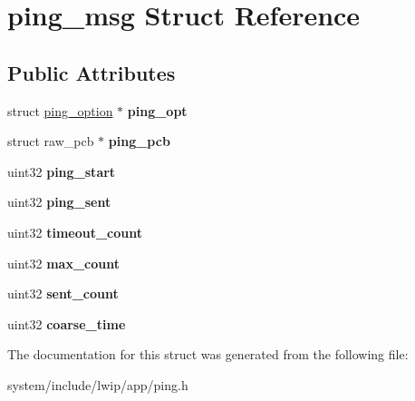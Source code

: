 \hypertarget{structping__msg}{}\section{ping\+\_\+msg Struct Reference}
\label{structping__msg}
\subsection*{Public Attributes}
\begin{DoxyCompactItemize}
\item 
\hypertarget{structping__msg_a154e32c7ee9f5c7897cfebd588601fa4}{}struct \hyperlink{structping__option}{ping\+\_\+option} $\ast$ {\bfseries ping\+\_\+opt}\label{structping__msg_a154e32c7ee9f5c7897cfebd588601fa4}

\item 
\hypertarget{structping__msg_a948f797503887ac1ed436f51385e4c00}{}struct raw\+\_\+pcb $\ast$ {\bfseries ping\+\_\+pcb}\label{structping__msg_a948f797503887ac1ed436f51385e4c00}

\item 
\hypertarget{structping__msg_a2c6d986481e35257721a8e5704e8b3d3}{}uint32 {\bfseries ping\+\_\+start}\label{structping__msg_a2c6d986481e35257721a8e5704e8b3d3}

\item 
\hypertarget{structping__msg_a4c4e086c4da3df826b116d58bf27ed0a}{}uint32 {\bfseries ping\+\_\+sent}\label{structping__msg_a4c4e086c4da3df826b116d58bf27ed0a}

\item 
\hypertarget{structping__msg_afdb5a471ef49fe050786c61724741ecc}{}uint32 {\bfseries timeout\+\_\+count}\label{structping__msg_afdb5a471ef49fe050786c61724741ecc}

\item 
\hypertarget{structping__msg_aad192e8bebb590a098d811cef32b0dda}{}uint32 {\bfseries max\+\_\+count}\label{structping__msg_aad192e8bebb590a098d811cef32b0dda}

\item 
\hypertarget{structping__msg_ae7a55a611561cc873d4f200256c5efd2}{}uint32 {\bfseries sent\+\_\+count}\label{structping__msg_ae7a55a611561cc873d4f200256c5efd2}

\item 
\hypertarget{structping__msg_a52a28f6f1dfc241d7050e93195ee6035}{}uint32 {\bfseries coarse\+\_\+time}\label{structping__msg_a52a28f6f1dfc241d7050e93195ee6035}

\end{DoxyCompactItemize}


The documentation for this struct was generated from the following file\+:\begin{DoxyCompactItemize}
\item 
system/include/lwip/app/ping.\+h\end{DoxyCompactItemize}
